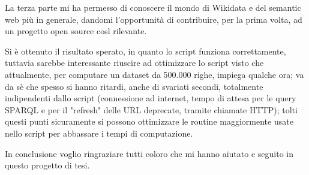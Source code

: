 La terza parte mi ha permesso di conoscere il mondo di Wikidata e del semantic web più in generale, dandomi l'opportunità di contribuire, per la prima volta, 
ad un progetto open source così rilevante.

Si è ottenuto il risultato sperato, in quanto lo script funziona correttamente, tuttavia sarebbe interessante riuscire ad ottimizzare lo script visto che attualmente, 
per computare un dataset da 500.000 righe, impiega qualche ora; 
va da sè che spesso si hanno ritardi, anche di svariati secondi, totalmente indipendenti dallo script (connessione ad internet, tempo di attesa per le query SPARQL 
e per il "refresh" delle URL deprecate, tramite chiamate HTTP); tolti questi punti sicuramente si possono ottimizzare le routine maggiormente usate nello script 
per abbassare i tempi di computazione.

In conclusione voglio ringraziare tutti coloro che mi hanno aiutato e seguito in questo progetto di tesi.
